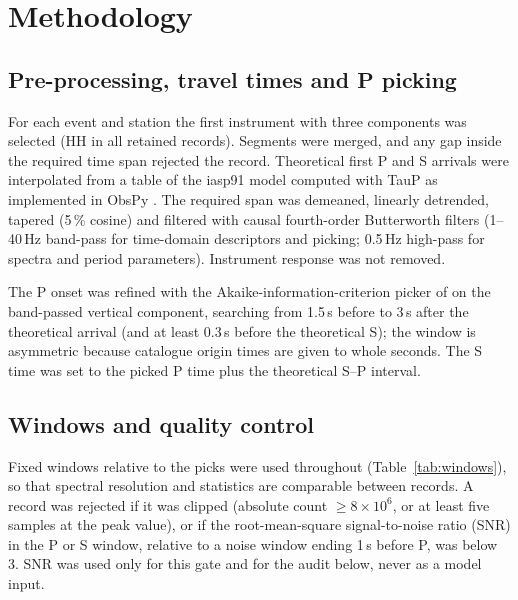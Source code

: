 \documentclass[11pt,a4paper]{article}
\begin{document}
\section{Methodology}
\label{sec:method}

\subsection{Pre-processing, travel times and P picking}
For each event and station the first instrument with three components was
selected (HH in all retained records). Segments were merged, and any gap inside the
required time span rejected the record. Theoretical first P and S arrivals
were interpolated from a table of the iasp91 model \citep{kennett1991} computed
with TauP \citep{crotwell1999} as implemented in ObsPy \citep{beyreuther2010}.
The required span was demeaned, linearly detrended, tapered (5\,\% cosine)
and filtered with causal fourth-order Butterworth filters (1--40\,Hz band-pass
  for time-domain descriptors and picking; 0.5\,Hz high-pass for spectra and
period parameters). Instrument response was not removed.

The P onset was refined with the Akaike-information-criterion picker of
\citet{maeda1985} on the band-passed vertical component, searching from 1.5\,s
before to 3\,s after the theoretical arrival (and at least 0.3\,s before the
theoretical S); the window is asymmetric because catalogue origin times are
given to whole seconds. The S time was set to the picked P time plus the
theoretical S--P interval.

\subsection{Windows and quality control}
Fixed windows relative to the picks were used throughout (Table~\ref{tab:windows}),
so that spectral resolution and statistics are comparable between records.
A record was rejected if it was clipped (absolute count $\geq 8\times10^{6}$, or at
least five samples at the peak value), or if the root-mean-square
signal-to-noise ratio (SNR) in the P or S window, relative to a noise window
ending 1\,s before P, was below 3. SNR was used only for this gate and for the
audit below, never as a model input.
\end{document}
